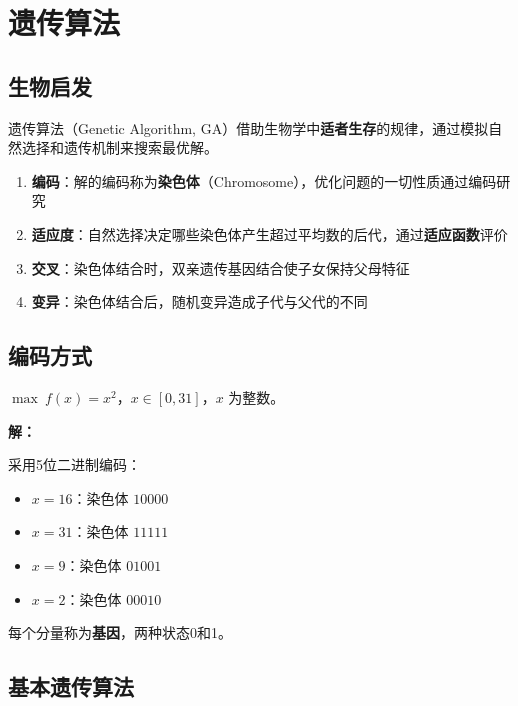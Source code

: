 \section{遗传算法}\label{sec:ga}

\subsection{生物启发}

遗传算法（Genetic Algorithm, GA）借助生物学中\textbf{适者生存}的规律，通过模拟自然选择和遗传机制来搜索最优解。

\begin{conceptbox}[遗传算法的核心特点]
\begin{enumerate}[label=\arabic*., leftmargin=2em]
    \item \textbf{编码}：解的编码称为\textbf{染色体}（Chromosome），优化问题的一切性质通过编码研究
    \item \textbf{适应度}：自然选择决定哪些染色体产生超过平均数的后代，通过\textbf{适应函数}评价
    \item \textbf{交叉}：染色体结合时，双亲遗传基因结合使子女保持父母特征
    \item \textbf{变异}：染色体结合后，随机变异造成子代与父代的不同
\end{enumerate}
\end{conceptbox}

\subsection{编码方式}

\begin{example}[二进制编码]
$\max\ f(x) = x^2$，$x \in [0, 31]$，$x$ 为整数。

\textbf{解：}

采用5位二进制编码：
\begin{itemize}
    \item $x = 16$：染色体 $10000$
    \item $x = 31$：染色体 $11111$
    \item $x = 9$：染色体 $01001$
    \item $x = 2$：染色体 $00010$
\end{itemize}
每个分量称为\textbf{基因}，两种状态0和1。
\end{example}

\subsection{基本遗传算法}

